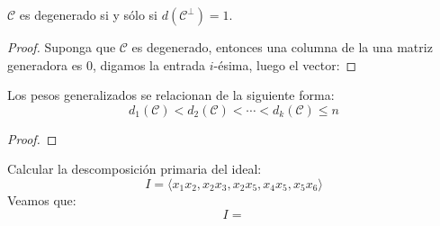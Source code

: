 \documentclass[12pt]{report}
\theoremstyle{largebreak}
\begin{document}
    \begin{excer}
        $\mathcal{C}$ es degenerado si y sólo si $d(\mathcal{C}^{\perp})=1$.
    \end{excer}

    \begin{proof}
        Suponga que $\mathcal{C}$ es degenerado, entonces una columna de la una matriz generadora es 0, digamos la entrada $i$-ésima, luego el vector:
    \end{proof}

    \begin{excer}
        Los pesos generalizados se relacionan de la siguiente forma:
        \begin{equation*}
            d_1(\mathcal{C})<d_2(\mathcal{C})<\cdots<d_k(\mathcal{C})\leq n
        \end{equation*}
    \end{excer}

    \begin{proof}
        
    \end{proof}

    \begin{excer}
        Calcular la descomposición primaria del ideal:
        \begin{equation*}
            I=\langle x_1x_2,x_2x_3,x_2x_5,x_4x_5,x_5x_6\rangle
        \end{equation*}
        Veamos que:
        \begin{equation*}
            I=
        \end{equation*}
    \end{excer}
\end{document}

